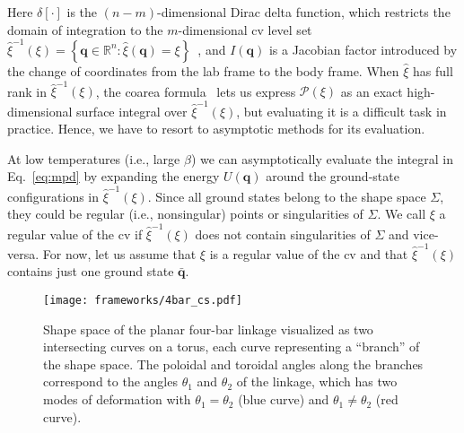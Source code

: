 Here $\delta[\cdot]$ is the $(n-m)$-dimensional Dirac delta function, which restricts the domain of integration to the $m$-dimensional \ac{cv} level set $\hat{\xi}^{-1}(\xi) = \left\{\bm{q} \in \mathbb{R}^{n}: \hat{\xi}(\bm{q}) = \xi\right\}$~\cite{hartmann2011}, and $I(\bm{q})$ is a Jacobian factor introduced by the change of coordinates from the lab frame to the body frame.
When $\hat{\xi}$ has full rank in $\hat{\xi}^{-1}(\xi)$, the coarea formula~\cite{lelievre2010} lets us express $\mathscr{P}(\xi)$ as an exact high-dimensional surface integral over $\hat{\xi}^{-1}(\xi)$, but evaluating it is a difficult task in practice.
Hence, we have to resort to asymptotic methods for its evaluation.

At low temperatures (i.e., large $\beta$) we can asymptotically evaluate the integral in Eq.~\eqref{eq:mpd} by expanding the energy $U(\bm{q})$ around the ground-state configurations in $\hat{\xi}^{-1}(\xi)$.
Since all ground states belong to the shape space $\Sigma$, they could be regular (i.e., nonsingular) points or singularities of $\Sigma$.
We call $\xi$ a regular value of the \ac{cv} if $\hat{\xi}^{-1}(\xi)$ does not contain singularities of $\Sigma$ and vice-versa.
For now, let us assume that $\xi$ is a regular value of the \ac{cv} and that $\hat{\xi}^{-1}(\xi)$ contains just one ground state $\bar{\bm{q}}$.
%
\begin{figure}
  \begin{center}
    \texttt{[image: frameworks/4bar\_cs.pdf]}
  \end{center}
  \caption{Shape space of the planar four-bar linkage visualized as two intersecting curves on a torus, each curve representing a ``branch'' of the shape space.
    The poloidal and toroidal angles along the branches correspond to the angles $\theta_1$ and $\theta_2$ of the linkage, which has two modes of deformation with $\theta_{1} = \theta_{2}$ (blue curve) and $\theta_{1} \ne \theta_{2}$ (red curve).}
  \label{fig:4bar_cs}
\end{figure}

